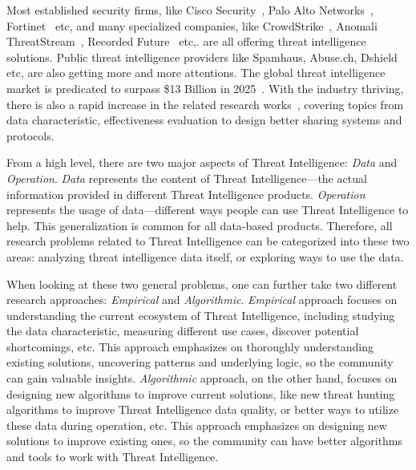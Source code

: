 \begin{dissertationintroduction}
Most established security firms, like Cisco Security~\cite{ciscotalos}, 
Palo Alto Networks~\cite{panautofocus}, Fortinet~\cite{fortinet} etc, 
and many specialized companies, like CrowdStrike~\cite{crowdstrike}, 
Anomali ThreatStream~\cite{anomali}, Recorded Future~\cite{recordedfuture}
etc,. are all offering threat intelligence solutions. Public threat
intelligence providers like Spamhaus, Abuse.ch, Dshield etc, are also 
getting more and more attentions. The global threat intelligence market is
predicated to surpass \$13 Billion in 2025~\cite{tipredict2018}. With the
industry thriving, there is also a rapid increase in the related research
works~\cite{tounsi2018survey}, covering topics from data characteristic,
effectiveness evaluation to design better sharing systems and protocols.

From a high level, there are two major aspects of Threat Intelligence: 
\textit{Data} and \textit{Operation}. \textit{Data} represents the content 
of Threat Intelligence---the actual information provided in different Threat
Intelligence products. \textit{Operation} represents the usage of 
data---different ways people can use Threat Intelligence to help. This
generalization is common for all data-based products. Therefore,
all research problems related to Threat Intelligence can be categorized into
these two areas: analyzing threat intelligence data itself, or exploring
ways to use the data.

When looking at these two general problems, one can further 
take two different research approaches: \textit{Empirical} and 
\textit{Algorithmic}. \textit{Empirical} approach focuses on understanding
the current ecosystem of Threat Intelligence, including studying the 
data characteristic, measuring different use cases, discover potential 
shortcomings, etc. This approach emphasizes on thoroughly understanding
existing solutions, uncovering patterns and underlying logic, 
so the community can gain valuable insights.
\textit{Algorithmic} approach, on the other hand, 
focuses on designing new algorithms to 
improve current solutions, like new threat hunting algorithms to improve 
Threat Intelligence data quality, or better ways to utilize these data 
during operation, etc. This approach emphasizes on designing new solutions 
to improve existing ones, so the community can have better algorithms and
tools to work with Threat Intelligence.


\end{dissertationintroduction}
